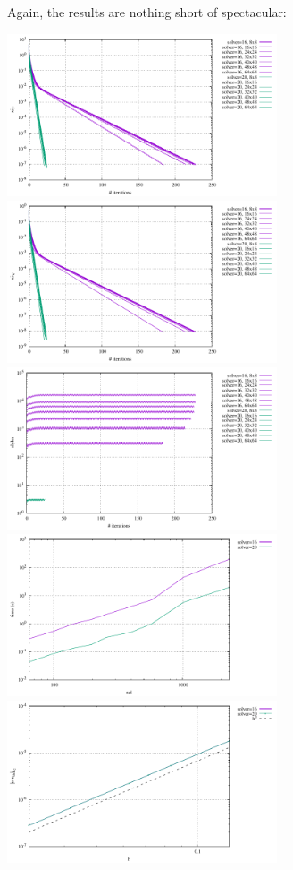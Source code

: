 Again, the results are nothing short of spectacular:

\begin{center}
\includegraphics[width=8cm]{python_codes/fieldstone_147/RESULTS/L2/uzawa2/solver_convergence_P.pdf}
\includegraphics[width=8cm]{python_codes/fieldstone_147/RESULTS/L2/uzawa2/solver_convergence_V.pdf} \\
\includegraphics[width=8cm]{python_codes/fieldstone_147/RESULTS/L2/uzawa2/solver_convergence_alpha.pdf}
\includegraphics[width=8cm]{python_codes/fieldstone_147/RESULTS/L2/uzawa2/time.pdf}\\
\includegraphics[width=8cm]{python_codes/fieldstone_147/RESULTS/L2/uzawa2/errorsV.pdf}

\end{center}
